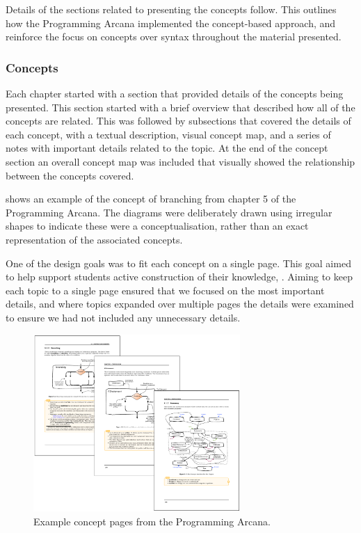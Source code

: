 Details of the sections related to presenting the concepts follow. This outlines how the Programming Arcana implemented the concept-based approach, and reinforce the focus on concepts over syntax throughout the material presented. 

\clearpage
\subsubsection{Concepts} %
\label{par:concepts}

Each chapter started with a section that provided details of the concepts being presented. This section started with a brief overview that described how all of the concepts are related. This was followed by subsections that covered the details of each concept, with a textual description, visual concept map, and a series of notes with important details related to the topic. At the end of the concept section an overall concept map was included that visually showed the relationship between the concepts covered. 

 shows an example of the concept of branching from chapter 5 of the Programming Arcana. The diagrams were deliberately drawn using irregular shapes to indicate these were a conceptualisation, rather than an exact representation of the associated concepts.

One of the design goals was to fit each concept on a single page. This goal aimed to help support students active construction of their knowledge, . Aiming to keep each topic to a single page ensured that we focused on the most important details, and where topics expanded over multiple pages the details were examined to ensure we had not included any unnecessary details.

\begin{figure}[hb]
  \centering
  \includegraphics[width=0.7\textwidth]{ArcanaConcepts}
  \caption{Example concept pages from the Programming Arcana.}
  \label{fig:arcana_concepts}
\end{figure}


